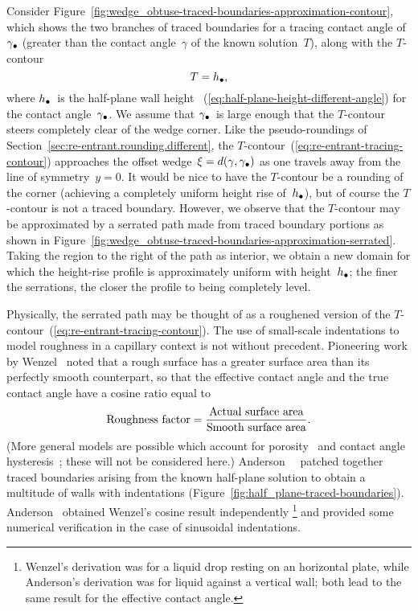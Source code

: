 Consider Figure~\ref{fig:wedge_obtuse-traced-boundaries-approximation-contour},
which shows the two branches of traced boundaries
for a tracing contact angle of~$\gamma_\bullet$
(greater than the contact angle~$\gamma$ of the known solution~$T$),
along with the $T$-contour
\begin{equation}
  T = h_\bullet,
  \label{eq:re-entrant-tracing-contour}
\end{equation}
where $h_\bullet$~is the half-plane wall height~%
  (\ref{eq:half-plane-height-different-angle})
for the contact angle~$\gamma_\bullet$.
We assume that $\gamma_\bullet$~is large enough
that the $T$-contour steers completely clear of the wedge corner.
Like the pseudo-roundings of Section~\ref{sec:re-entrant.rounding.different},
the $T$-contour~(\ref{eq:re-entrant-tracing-contour})
approaches the offset wedge~$\xi = d (\gamma, \gamma_\bullet)$
as one travels away from the line of symmetry~$y = 0$.
It would be nice to have the $T$-contour be a rounding of the corner
(achieving a completely uniform height rise of~$h_\bullet$),
but of course the $T$-contour is not a traced boundary.
However, we observe that the $T$-contour may be approximated
by a serrated path made from traced boundary portions
as shown in
Figure~\ref{fig:wedge_obtuse-traced-boundaries-approximation-serrated}.
Taking the region to the right of the path as interior,
we obtain a new domain
for which the height-rise profile is approximately uniform
with height~$h_\bullet$;
the finer the serrations,
the closer the profile to being completely level.

Physically, the serrated path
may be thought of as a roughened version
of the $T$-contour~(\ref{eq:re-entrant-tracing-contour}).
The use of small-scale indentations
to model roughness in a capillary context
is not without precedent.
Pioneering work
by Wenzel~\cite{wenzel-1936-resistance-solid-surfaces-wetting}
noted that a rough surface has a greater surface area
than its perfectly smooth counterpart,
so that the effective contact angle and the true contact angle
have a cosine ratio equal to
\begin{equation}
  \textnormal{Roughness factor} =
    \frac{\textnormal{Actual surface area}}{\textnormal{Smooth surface area}}.
  \label{eq:wenzel-roughness}
\end{equation}
(More general models are possible which account for
porosity~\cite{cassie-1944-wettability-porous-surfaces}
and contact angle hysteresis~\cite{
  cox-1983-spreading-liquid-rough-surface,
  johnson-1964-contact-angle-hysteresis
};
these will not be considered here.)
Anderson~\etal~\cite{anderson-2006-exact-solutions-laplace-young}
patched together traced boundaries
arising from the known half-plane solution
to obtain a multitude of walls with indentations
(Figure~\ref{fig:half_plane-traced-boundaries}).
Anderson~\cite[Section~6.4]{anderson-2002-thesis-boundary-tracing-pdes}
obtained Wenzel's cosine result independently%
\footnote{
  Wenzel's derivation was for a liquid drop resting on an horizontal plate,
  while Anderson's derivation was for liquid against a vertical wall;
  both lead to the same result for the effective contact angle.
}
and provided some numerical verification
in the case of sinusoidal indentations.

